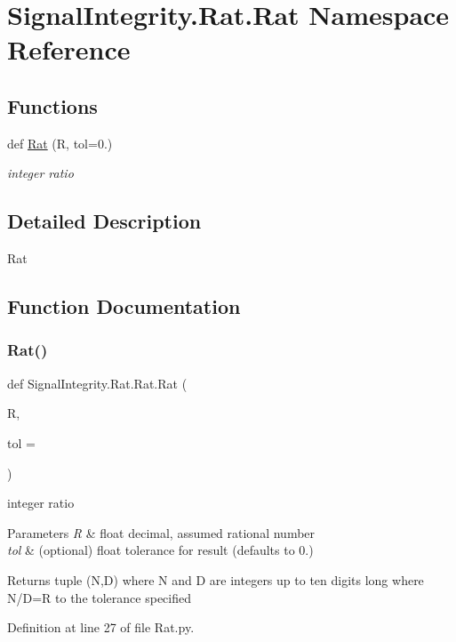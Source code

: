 \hypertarget{namespaceSignalIntegrity_1_1Rat_1_1Rat}{}\section{Signal\+Integrity.\+Rat.\+Rat Namespace Reference}
\label{namespaceSignalIntegrity_1_1Rat_1_1Rat}
\subsection*{Functions}
\begin{DoxyCompactItemize}
\item 
def \hyperlink{namespaceSignalIntegrity_1_1Rat_1_1Rat_acc3b9d0a67b9183c114fe38b1c48eb52}{Rat} (R, tol=0.)
\begin{DoxyCompactList}\small\item\em integer ratio \end{DoxyCompactList}\end{DoxyCompactItemize}


\subsection{Detailed Description}
\begin{DoxyVerb}Rat\end{DoxyVerb}
 

\subsection{Function Documentation}
\mbox{\label{namespaceSignalIntegrity_1_1Rat_1_1Rat_acc3b9d0a67b9183c114fe38b1c48eb52}} 
\subsubsection{\texorpdfstring{Rat()}{Rat()}}
{\footnotesize\ttfamily def Signal\+Integrity.\+Rat.\+Rat.\+Rat (\begin{DoxyParamCaption}\item[{}]{R,  }\item[{}]{tol = {} }\end{DoxyParamCaption})}



integer ratio 


\begin{DoxyParams}{Parameters}
{\em R} & float decimal, assumed rational number \\
\hline
{\em tol} & (optional) float tolerance for result (defaults to 0.) \\
\hline
\end{DoxyParams}
\begin{DoxyReturn}{Returns}
tuple (N,D) where N and D are integers up to ten digits long where N/D=R to the tolerance specified 
\end{DoxyReturn}


Definition at line 27 of file Rat.\+py.

